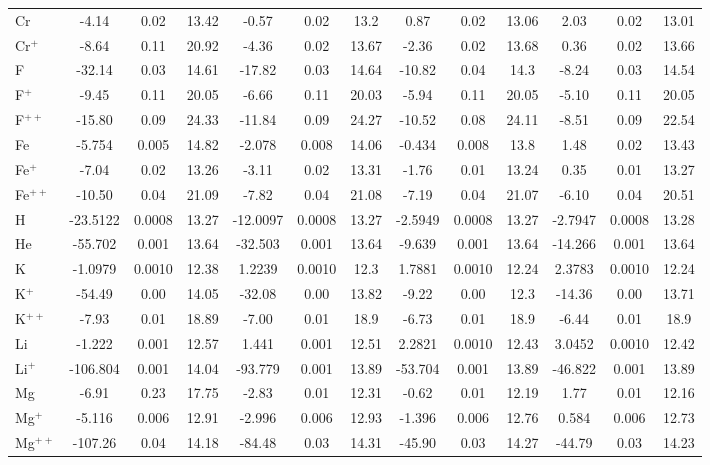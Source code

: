 \begin{longtable}{l!{\vrule width 0.25pt}ccc!{\vrule width 0.25pt}ccc!{\vrule width 0.25pt}ccc!{\vrule width 0.25pt}ccc}
Cr & -4.14 & 0.02 & 13.42 & -0.57 & 0.02 & 13.2 & 0.87 & 0.02 & 13.06 & 2.03 & 0.02 & 13.01 \\
Cr$^+$ & -8.64 & 0.11 & 20.92 & -4.36 & 0.02 & 13.67 & -2.36 & 0.02 & 13.68 & 0.36 & 0.02 & 13.66 \\
F & -32.14 & 0.03 & 14.61 & -17.82 & 0.03 & 14.64 & -10.82 & 0.04 & 14.3 & -8.24 & 0.03 & 14.54 \\
F$^+$ & -9.45 & 0.11 & 20.05 & -6.66 & 0.11 & 20.03 & -5.94 & 0.11 & 20.05 & -5.10 & 0.11 & 20.05 \\
F$^{++}$ & -15.80 & 0.09 & 24.33 & -11.84 & 0.09 & 24.27 & -10.52 & 0.08 & 24.11 & -8.51 & 0.09 & 22.54 \\
Fe & -5.754 & 0.005 & 14.82 & -2.078 & 0.008 & 14.06 & -0.434 & 0.008 & 13.8 & 1.48 & 0.02 & 13.43 \\
Fe$^+$ & -7.04 & 0.02 & 13.26 & -3.11 & 0.02 & 13.31 & -1.76 & 0.01 & 13.24 & 0.35 & 0.01 & 13.27 \\
Fe$^{++}$ & -10.50 & 0.04 & 21.09 & -7.82 & 0.04 & 21.08 & -7.19 & 0.04 & 21.07 & -6.10 & 0.04 & 20.51 \\
H & -23.5122 & 0.0008 & 13.27 & -12.0097 & 0.0008 & 13.27 & -2.5949 & 0.0008 & 13.27 & -2.7947 & 0.0008 & 13.28 \\
He & -55.702 & 0.001 & 13.64 & -32.503 & 0.001 & 13.64 & -9.639 & 0.001 & 13.64 & -14.266 & 0.001 & 13.64 \\
K & -1.0979 & 0.0010 & 12.38 & 1.2239 & 0.0010 & 12.3 & 1.7881 & 0.0010 & 12.24 & 2.3783 & 0.0010 & 12.24 \\
K$^+$ & -54.49 & 0.00 & 14.05 & -32.08 & 0.00 & 13.82 & -9.22 & 0.00 & 12.3 & -14.36 & 0.00 & 13.71 \\
K$^{++}$ & -7.93 & 0.01 & 18.89 & -7.00 & 0.01 & 18.9 & -6.73 & 0.01 & 18.9 & -6.44 & 0.01 & 18.9 \\
Li & -1.222 & 0.001 & 12.57 & 1.441 & 0.001 & 12.51 & 2.2821 & 0.0010 & 12.43 & 3.0452 & 0.0010 & 12.42 \\
Li$^+$ & -106.804 & 0.001 & 14.04 & -93.779 & 0.001 & 13.89 & -53.704 & 0.001 & 13.89 & -46.822 & 0.001 & 13.89 \\
Mg & -6.91 & 0.23 & 17.75 & -2.83 & 0.01 & 12.31 & -0.62 & 0.01 & 12.19 & 1.77 & 0.01 & 12.16 \\
Mg$^+$ & -5.116 & 0.006 & 12.91 & -2.996 & 0.006 & 12.93 & -1.396 & 0.006 & 12.76 & 0.584 & 0.006 & 12.73 \\
Mg$^{++}$ & -107.26 & 0.04 & 14.18 & -84.48 & 0.03 & 14.31 & -45.90 & 0.03 & 14.27 & -44.79 & 0.03 & 14.23 \\

\end{longtable}
